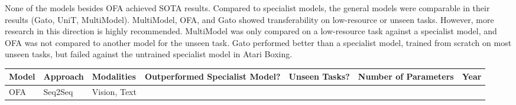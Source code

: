 \documentclass[
]{krantz}
\begin{document}
None of the models besides OFA achieved SOTA results. Compared to specialist models, the general models were comparable in their results (Gato, UniT, MultiModel). MultiModel, OFA, and Gato showed transferability on
low-resource or unseen tasks. However, more research in this direction is highly recommended. MultiModel was only compared on a low-resource task against a specialist model,
and OFA was not compared to another model for the unseen task. Gato performed better than a specialist model, trained from scratch on most unseen tasks, but failed against the untrained specialist
model in Atari Boxing.

\begin{longtable}[]{@{}lllllll@{}}
\toprule
\begin{minipage}[b]{0.12\columnwidth}\raggedright
Model\strut
\end{minipage} & \begin{minipage}[b]{0.12\columnwidth}\raggedright
Approach\strut
\end{minipage} & \begin{minipage}[b]{0.12\columnwidth}\raggedright
Modalities\strut
\end{minipage} & \begin{minipage}[b]{0.12\columnwidth}\raggedright
Outperformed Specialist Model?\strut
\end{minipage} & \begin{minipage}[b]{0.12\columnwidth}\raggedright
Unseen Tasks?\strut
\end{minipage} & \begin{minipage}[b]{0.12\columnwidth}\raggedright
Number of Parameters\strut
\end{minipage} & \begin{minipage}[b]{0.12\columnwidth}\raggedright
Year\strut
\end{minipage}\tabularnewline
\midrule
\endhead
\begin{minipage}[t]{0.12\columnwidth}\raggedright
OFA\strut
\end{minipage} & \begin{minipage}[t]{0.12\columnwidth}\raggedright
Seq2Seq\strut
\end{minipage} & \begin{minipage}[t]{0.12\columnwidth}\raggedright
Vision, Text\strut
\end{minipage} & \begin{minipage}[t]{0.12\columnwidth}\raggedright
\strut
\end{minipage} & \begin{minipage}[t]{0.12\columnwidth}\raggedright

\end{minipage}
\end{longtable}
\end{document}
